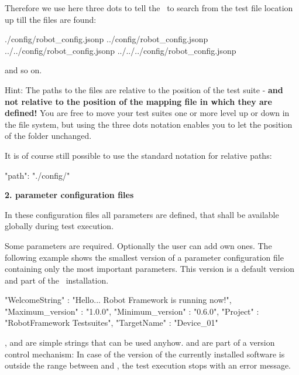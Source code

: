 Therefore we use here three dots to tell the \pkg\ to search from the test
file location up till the  files are found:

\begin{pythonlog}
./config/robot_config.jsonp
../config/robot_config.jsonp
../../config/robot_config.jsonp
../../../config/robot_config.jsonp
\end{pythonlog}

and so on.

Hint: The paths to the  files are relative to the position of the test suite - \textbf{and not relative to the position of the
mapping file in which they are defined!} You are free to move your test suites one or more level up or down in the file system, but using the
three dots notation enables you to let the position of the  folder unchanged.

It is of course still possible to use the standard notation for relative paths:

\begin{pythoncode}
"path": "./config/"
\end{pythoncode}

\newpage

\textbf{2. parameter configuration files}

In these configuration files all parameters are defined, that shall be available globally during test execution.

Some parameters are required. Optionally the user can add own ones. The following example shows the smallest version
of a parameter configuration file containing only the most important parameters. This version is a default version and part of the
\pkg\ installation.

\begin{pythoncode}
{
  "WelcomeString"   : "Hello... Robot Framework is running now!",
  "Maximum_version" : "1.0.0",
  "Minimum_version" : "0.6.0",
  "Project"         : "RobotFramework Testsuites",
  "TargetName"      : "Device_01"
}
\end{pythoncode}

,  and  are simple strings that can be used anyhow. 
and  are part of a version control mechanism: In case of the version of the currently installed
software is outside the range between  and , the test execution stops
with an error message.


